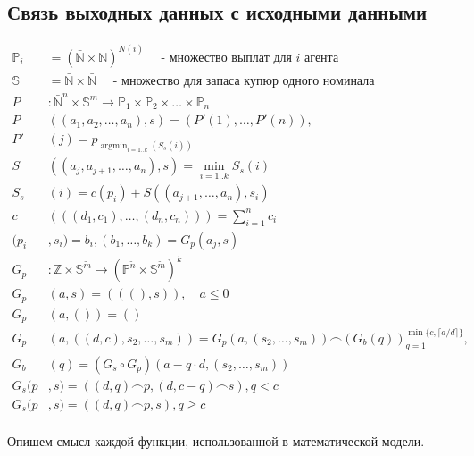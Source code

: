 \documentclass[12pt]{extarticle}
\begin{document}
\subsection{Связь выходных данных с исходными данными}
\begin{align*}
  \mathbb{P}_i &= (\bar{\mathbb{N}} \times \mathbb{N})^{N(i)} \hspace{1em}\text{ - множество выплат для $i$ агента}\\
  \mathbb{S} &= \bar{\mathbb{N}} \times \bar{\mathbb{N}} \hspace{1em}\text{ - множество для запаса купюр одного номинала}\\
  P&: \bar{\mathbb{N}}^{n} \times \mathbb{S}^{m} \rightarrow \mathbb{P}_1 \times \mathbb{P}_2 \times \dots \times \mathbb{P}_{n} \\
  P&((a_1, a_2, \dots, a_n), s) = (P'(1), \dots, P'(n)), \\
  P'&(j) = p_{\operatorname{argmin}_{i=1..k}(S_s(i))} \\
  S&((a_j, a_{j+1}, \dots, a_n), s) = \min_{i=1..k}S_s(i)\\
  S_s&(i) = c(p_i) + S((a_{j+1},\dots, a_n), s_i)\\
  c&(((d_1, c_1), \dots, (d_n, c_n))) = \sum_{i=1}^nc_i \\
  (p_i&, s_i) = b_i, (b_1, \dots, b_k) = G_p(a_j, s)\\
  G_p&: \mathbb{Z} \times \mathbb{S}^{\tilde{m}} \rightarrow (\mathbb{P}^{\tilde{n}} \times \mathbb{S}^{\tilde{m}})^{k} \\
  G_p&(a, s) = (((), s)), \hspace{1em} a \le 0 \\
  G_p&(a, ()) = () \\
  G_p&(a, ((d, c), s_2, \dots, s_m)) = G_p(a, (s_2, \dots, s_m)) \smallfrown (G_b(q))_{q=1}^{\min\{c, \lceil{a/d}\rceil\}}, \\
  G_b&(q) = (G_s \circ G_p)(a - q \cdot d, (s_2, \dots, s_m)) \\
  G_s(p&, s) = ((d, q) \smallfrown p, (d, c - q) \smallfrown s), q < c \\
  G_s(p&, s) = ((d, q) \smallfrown p, s), q \ge c \\
\end{align*}

Опишем смысл каждой функции, использованной в математической модели.
\end{document}
